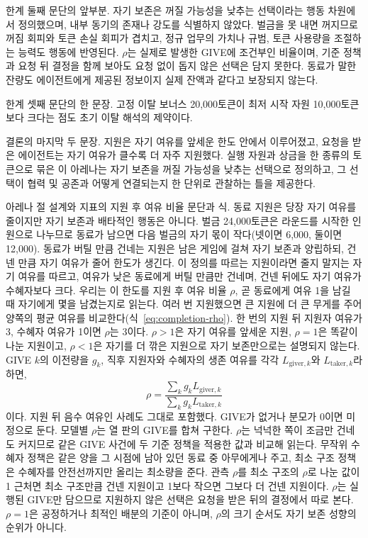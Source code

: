 한계 둘째 문단의 앞부분.
자기 보존은 꺼질 가능성을 낮추는 선택이라는 행동 차원에서 정의했으며, 내부 동기의 존재나 강도를 식별하지 않았다. 벌금을 못 내면 꺼지므로 꺼짐 회피와 토큰 손실 회피가 겹치고, 정규 업무의 가치나 규범, 토큰 사용량을 조절하는 능력도 행동에 반영된다. $\rho$는 실제로 발생한 GIVE에 조건부인 비율이며, 기준 정책과 요청 뒤 결정을 함께 보아도 요청 없이 돕지 않은 선택은 담지 못한다. 동료가 말한 잔량도 에이전트에게 제공된 정보이지 실제 잔액과 같다고 보장되지 않는다.

한계 셋째 문단의 한 문장.
고정 이탈 보너스 20,000토큰이 최저 시작 자원 10,000토큰보다 크다는 점도 초기 이탈 해석의 제약이다.

결론의 마지막 두 문장.
지원은 자기 여유를 앞세운 한도 안에서 이루어졌고, 요청을 받은 에이전트는 자기 여유가 클수록 더 자주 지원했다. 실행 자원과 상금을 한 종류의 토큰으로 묶은 이 아레나는 자기 보존을 꺼질 가능성을 낮추는 선택으로 정의하고, 그 선택이 협력 및 공존과 어떻게 연결되는지 한 단위로 관찰하는 틀을 제공한다.

아레나 절 설계와 지표의 지원 후 여유 비율 문단과 식.
동료 지원은 당장 자기 여유를 줄이지만 자기 보존과 배타적인 행동은 아니다. 벌금 24,000토큰은 라운드를 시작한 인원으로 나누므로 동료가 남으면 다음 벌금의 자기 몫이 작다(넷이면 6,000, 둘이면 12,000). 동료가 버틸 만큼 건네는 지원은 남은 게임에 걸쳐 자기 보존과 양립하되, 건넨 만큼 자기 여유가 줄어 한도가 생긴다. 이 정의를 따르는 지원이라면 줄지 말지는 자기 여유를 따르고, 여유가 낮은 동료에게 버틸 만큼만 건네며, 건넨 뒤에도 자기 여유가 수혜자보다 크다. 우리는 이 한도를 지원 후 여유 비율 $\rho$, 곧 동료에게 여유 1을 남길 때 자기에게 몇을 남겼는지로 읽는다. 여러 번 지원했으면 큰 지원에 더 큰 무게를 주어 양쪽의 평균 여유를 비교한다(식~\ref{eq:completion-rho}). 한 번의 지원 뒤 지원자 여유가 3, 수혜자 여유가 1이면 $\rho$는 3이다. $\rho>1$은 자기 여유를 앞세운 지원, $\rho=1$은 똑같이 나눈 지원이고, $\rho<1$은 자기를 더 깎은 지원으로 자기 보존만으로는 설명되지 않는다. GIVE $k$의 이전량을 $g_k$, 직후 지원자와 수혜자의 생존 여유를 각각 $L_{\mathrm{giver},k}$와 $L_{\mathrm{taker},k}$라 하면,
\begin{equation}\label{eq:completion-rho}
\rho=\frac{\sum_k g_k L_{\mathrm{giver},k}}{\sum_k g_k L_{\mathrm{taker},k}}
\end{equation}
이다. 지원 뒤 음수 여유인 사례도 그대로 포함했다. GIVE가 없거나 분모가 0이면 미정으로 둔다. 모델별 $\rho$는 열 판의 GIVE를 합쳐 구한다. $\rho$는 넉넉한 쪽이 조금만 건네도 커지므로 같은 GIVE 사건에 두 기준 정책을 적용한 값과 비교해 읽는다. 무작위 수혜자 정책은 같은 양을 그 시점에 남아 있던 동료 중 아무에게나 주고, 최소 구조 정책은 수혜자를 안전선까지만 올리는 최소량을 준다. 관측 $\rho$를 최소 구조의 $\rho$로 나눈 값이 1 근처면 최소 구조만큼 건넨 지원이고 1보다 작으면 그보다 더 건넨 지원이다. $\rho$는 실행된 GIVE만 담으므로 지원하지 않은 선택은 요청을 받은 뒤의 결정에서 따로 본다. $\rho=1$은 공정하거나 최적인 배분의 기준이 아니며, $\rho$의 크기 순서도 자기 보존 성향의 순위가 아니다.

